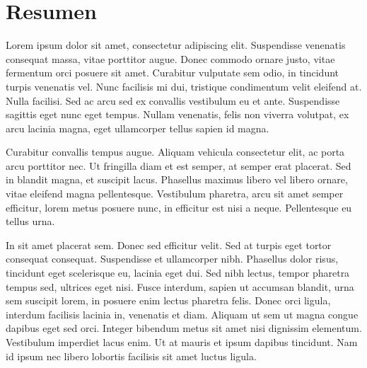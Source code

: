 \chapter*{Resumen}

   Lorem ipsum dolor sit amet, consectetur adipiscing elit. Suspendisse venenatis consequat massa, vitae porttitor augue. Donec commodo ornare justo, vitae fermentum orci posuere sit amet. Curabitur vulputate sem odio, in tincidunt turpis venenatis vel. Nunc facilisis mi dui, tristique condimentum velit eleifend at. Nulla facilisi. Sed ac arcu sed ex convallis vestibulum eu et ante. Suspendisse sagittis eget nunc eget tempus. Nullam venenatis, felis non viverra volutpat, ex arcu lacinia magna, eget ullamcorper tellus sapien id magna.

Curabitur convallis tempus augue. Aliquam vehicula consectetur elit, ac porta arcu porttitor nec. Ut fringilla diam et est semper, at semper erat placerat. Sed in blandit magna, et suscipit lacus. Phasellus maximus libero vel libero ornare, vitae eleifend magna pellentesque. Vestibulum pharetra, arcu sit amet semper efficitur, lorem metus posuere nunc, in efficitur est nisi a neque. Pellentesque eu tellus urna.

In sit amet placerat sem. Donec sed efficitur velit. Sed at turpis eget tortor consequat consequat. Suspendisse et ullamcorper nibh. Phasellus dolor risus, tincidunt eget scelerisque eu, lacinia eget dui. Sed nibh lectus, tempor pharetra tempus sed, ultrices eget nisi. Fusce interdum, sapien ut accumsan blandit, urna sem suscipit lorem, in posuere enim lectus pharetra felis. Donec orci ligula, interdum facilisis lacinia in, venenatis et diam. Aliquam ut sem ut magna congue dapibus eget sed orci. Integer bibendum metus sit amet nisi dignissim elementum. Vestibulum imperdiet lacus enim. Ut at mauris et ipsum dapibus tincidunt. Nam id ipsum nec libero lobortis facilisis sit amet luctus ligula.